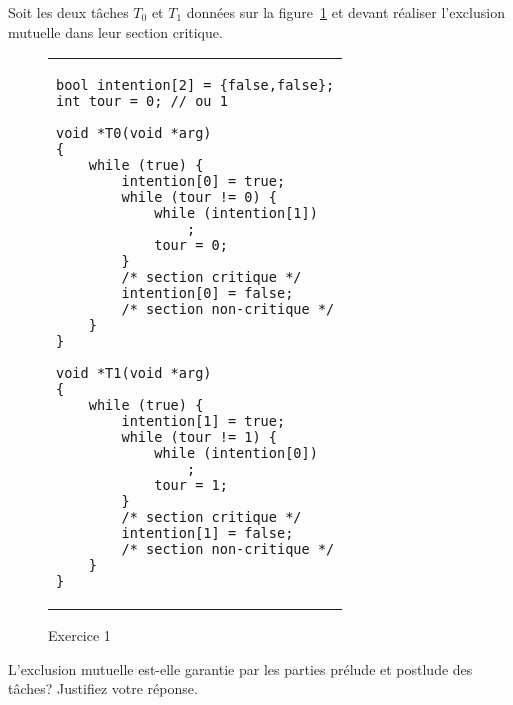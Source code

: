 \startexercice

Soit les deux tâches $T_0$ et $T_1$ données sur la figure~\ref{algex:Exercice1} et devant réaliser l'exclusion mutuelle dans leur section critique.
\begin{figure}[!ht]

\centering
\begin{tabular}{l}
\lstset{language=C++}
\begin{lstlisting}
bool intention[2] = {false,false};
int tour = 0; // ou 1

void *T0(void *arg)
{
	while (true) {
		intention[0] = true;
		while (tour != 0) {
			while (intention[1])
				;
			tour = 0;
		}
		/* section critique */
		intention[0] = false;
		/* section non-critique */
	}
}

void *T1(void *arg)
{
	while (true) {
		intention[1] = true;
		while (tour != 1) {
			while (intention[0])
				;
			tour = 1;
		}
		/* section critique */
		intention[1] = false;
		/* section non-critique */
	}
}
\end{lstlisting}
\end{tabular}
\caption{\label{algex:Exercice1}Exercice 1}

\end{figure}
L'exclusion mutuelle est-elle garantie par les parties prélude et postlude des tâches? Justifiez votre réponse.
